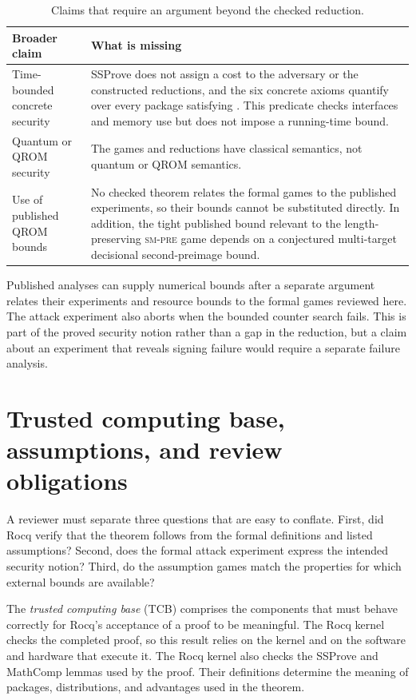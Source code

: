 \documentclass[11pt,a4paper]{article}
\theoremstyle{plain}
\theoremstyle{definition}
\DeclareRobustCommand{\coq}[1]{\texttt{\detokenize{#1}}}
\newcommand{\SSProve}{\textsf{SSProve}\xspace}
\newcommand{\smpre}{\textsc{sm-pre}\xspace}
\begin{document}
\begin{table}[H]
\centering
\caption{Claims that require an argument beyond the checked reduction.}
\label{tab:limits}
\small
\begin{tabular}{@{}L{0.29\textwidth}L{0.63\textwidth}@{}}
\toprule
Broader claim & What is missing \\
\midrule
Time-bounded concrete security & \SSProve does not assign a cost to the adversary or the constructed reductions, and the six concrete axioms quantify over every package satisfying \coq{ValidPackage}. This predicate checks interfaces and memory use but does not impose a running-time bound. \\
Quantum or QROM security & The games and reductions have classical semantics, not quantum or QROM semantics. \\
Use of published QROM bounds & No checked theorem relates the formal games to the published experiments, so their bounds cannot be substituted directly. In addition, the tight published bound relevant to the length-preserving \smpre game depends on a conjectured multi-target decisional second-preimage bound. \\
\bottomrule
\end{tabular}
\end{table}

Published analyses can supply numerical bounds after a separate argument relates their experiments and resource bounds to the formal games reviewed here.
The attack experiment also aborts when the bounded counter search fails.
This is part of the proved security notion rather than a gap in the reduction, but a claim about an experiment that reveals signing failure would require a separate failure analysis.


\section{Trusted computing base, assumptions, and review obligations}
\label{sec:trust}

A reviewer must separate three questions that are easy to conflate.
First, did Rocq verify that the theorem follows from the formal definitions and listed assumptions?
Second, does the formal attack experiment express the intended security notion?
Third, do the assumption games match the properties for which external bounds are available?

The \emph{trusted computing base} (TCB) comprises the components that must behave correctly for Rocq's acceptance of a proof to be meaningful.
The Rocq kernel checks the completed proof, so this result relies on the kernel and on the software and hardware that execute it.
The Rocq kernel also checks the \SSProve and MathComp lemmas used by the proof.
Their definitions determine the meaning of packages, distributions, and advantages used in the theorem.
\end{document}
